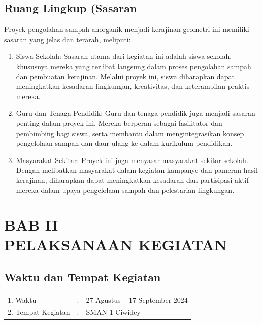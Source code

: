 \documentclass[a4paper,12pt]{article}
\begin{document}
\subsection{Ruang Lingkup (Sasaran}
Proyek pengolahan sampah anorganik menjadi kerajinan geometri ini memiliki sasaran yang jelas dan terarah, meliputi: 
\begin{enumerate}
    \item     Siswa Sekolah: Sasaran utama dari kegiatan ini adalah siswa sekolah, khususnya mereka yang terlibat langsung dalam proses pengolahan sampah dan pembuatan kerajinan. Melalui proyek ini, siswa diharapkan dapat meningkatkan kesadaran lingkungan, kreativitas, dan keterampilan praktis mereka. 
    \item     Guru dan Tenaga Pendidik: Guru dan tenaga pendidik juga menjadi sasaran penting dalam proyek ini. Mereka berperan sebagai fasilitator dan pembimbing bagi siswa, serta membantu dalam mengintegrasikan konsep pengelolaan sampah dan daur ulang ke dalam kurikulum pendidikan. 
    \item     Masyarakat Sekitar: Proyek ini juga menyasar masyarakat sekitar sekolah. Dengan melibatkan masyarakat dalam kegiatan kampanye dan pameran hasil kerajinan, diharapkan dapat meningkatkan kesadaran dan partisipasi aktif mereka dalam upaya pengelolaan sampah dan pelestarian lingkungan. 
\end{enumerate}
\pagebreak
    \section*{BAB II\\PELAKSANAAN KEGIATAN}
\setcounter{section}{2}
 \setcounter{subsection}{0}
\subsection{Waktu dan Tempat Kegiatan}

 \begin{table}[ht]
     \centering
     \begin{tabular}{lll}
          1. Waktu&:  &27 Agustus -- 17 September 2024 \\
          2. Tempat Kegiatan&:  & SMAN 1 Ciwidey \\
     \end{tabular}
 \end{table}
\end{document}
